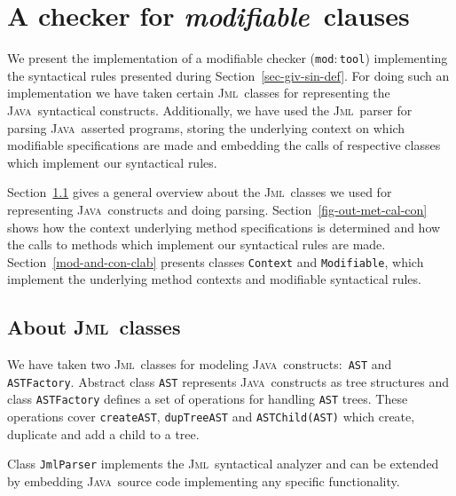 \documentclass[a4paper]{llncs}
\newcommand{\jml}{\textsc{Jml}}
\newcommand{\java}{\textsc{Java}}
\newcommand{\modtool}{\texttt{mod$:$tool}}
\newcommand{\modif}{\textit{modifiable}}
\begin{document}






\section{A checker for \modif~clauses}
\label{sec-imp-iss}
We present the implementation of a modifiable checker (\modtool)
implementing the syntactical rules presented during
Section~\ref{sec-giv-sin-def}. For doing such an implementation we
have taken certain \jml~classes for representing the \java~syntactical 
constructs. Additionally, we have used the \jml~parser for parsing
\java~asserted programs, storing the underlying context on which
modifiable specifications are made and embedding the calls of
respective classes which implement our syntactical rules.

Section~\ref{abo-jml-cla-use} gives a general overview about the
\jml~classes we used for representing \java~constructs and doing
parsing. Section~\ref{fig-out-met-cal-con} shows how the
context underlying method specifications is determined and how
the calls to methods which implement our syntactical
rules are made. Section~\ref{mod-and-con-clab} presents classes
\texttt{Context} and \texttt{Modifiable}, which implement the
underlying method contexts and modifiable syntactical rules.




\subsection{About \jml~classes}
\label{abo-jml-cla-use}
We have taken two \jml~classes for modeling \java~constructs$:$
\texttt{AST} and \texttt{ASTFactory}. Abstract class \texttt{AST}
represents \java~constructs as tree structures and class
\texttt{ASTFactory} defines a set of operations for handling
\texttt{AST} trees. These operations cover \texttt{create{AST}},
\texttt{dupTree{AST}} and \texttt{ASTChild(AST)} which create,
duplicate and add a child to a tree.

Class \texttt{JmlParser} implements the \jml~syntactical analyzer and
can be extended by embedding \java~source code implementing any
specific functionality.
\end{document}
